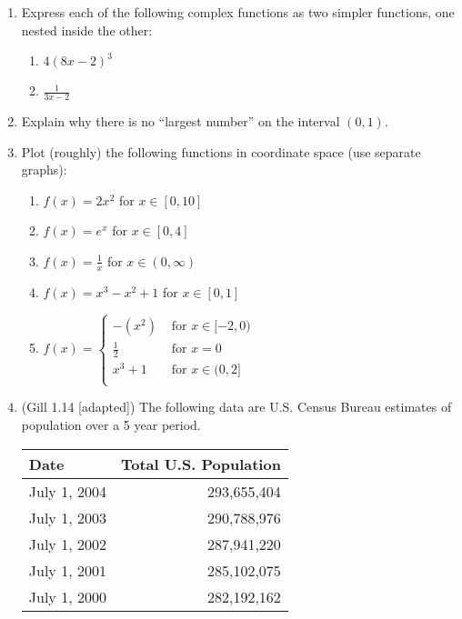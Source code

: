 \documentclass[11pt]{article}
\begin{document}
\begin{enumerate}
\item Express each of the following complex functions as two simpler functions, one nested inside the other:
\begin{enumerate}
  \item $4(8x-2)^3$ %
  \item $\frac{1}{3x-2}$ %
\end{enumerate}


\item Explain why there is no ``largest number'' on the interval $(0,1)$.


\item Plot (roughly) the following functions in coordinate space (use separate graphs):
\begin{enumerate}
\item $f(x) = 2x^2$ for $x \in [0,10]$
\item $f(x) = e^{x}$ for $x \in [0,4]$
\item $f(x) = \frac{1}{x}$ for $x \in (0,\infty)$
\item $f(x) = x^3 - x^2 + 1$ for $x \in [0,1]$
\item $f(x)=\left\{\begin{array}{cl}
 -(x^2)  & \textrm{~for~} x \in [-2,0)\\
 \frac{1}{2} & \textrm{~for~} x = 0\\
    x^3 + 1 & \textrm{~for~} x \in (0,2]\\
    \end{array}\right.$
\end{enumerate}



\item (Gill 1.14 [adapted]) The following data are U.S. Census Bureau estimates of population over a 5 year period.

\begin{center}
\begin{tabular}{lr}
Date         & Total U.S. Population \\ \hline
July 1, 2004 & 293,655,404 \\
July 1, 2003 & 290,788,976 \\
July 1, 2002 & 287,941,220 \\
July 1, 2001 & 285,102,075 \\
July 1, 2000 & 282,192,162 \\ \hline
\end{tabular}
\end{center}


\end{enumerate}
\end{document}
